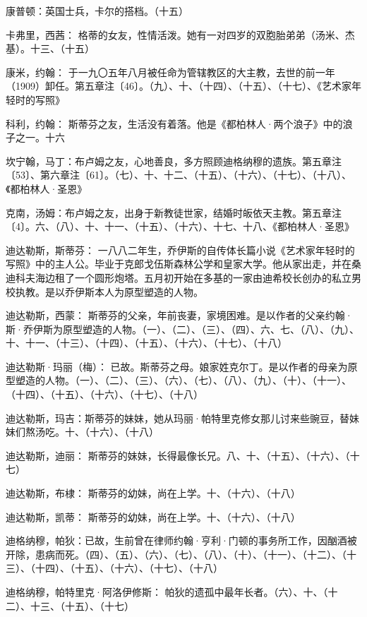 \par 康普顿：英国士兵，卡尔的搭档。（十五）
\par 卡弗里，西茜： 格蒂的女友，性情活泼。她有一对四岁的双胞胎弟弟（汤米、杰基）。十三、（十五）
\par 康米，约翰： 于一九〇五年八月被任命为管辖教区的大主教，去世的前一年（1909）卸任。第五章注〔46〕。（九）、十、（十四）、（十五）、（十七）、《艺术家年轻时的写照》
\par 科利，约翰： 斯蒂芬之友，生活没有着落。他是《都柏林人·两个浪子》中的浪子之一。十六
\par 坎宁翰，马丁：布卢姆之友，心地善良，多方照顾迪格纳穆的遗族。第五章注〔53〕、第六章注〔61〕。（七）、十、十二、（十五）、（十六）、（十七）、（十八）、《都柏林人·圣恩》
\par 克南，汤姆：布卢姆之友，出身于新教徒世家，结婚时皈依天主教。第五章注〔4〕。六、（八）、十、十一、（十五）、（十六）、十七、十八、《都柏林人·圣恩》
\par 迪达勒斯，斯蒂芬： 一八八二年生，乔伊斯的自传体长篇小说《艺术家年轻时的写照》中的主人公。毕业于克郎戈伍斯森林公学和皇家大学。他从家出走，并在桑迪科夫海边租了一个圆形炮塔。五月初开始在多基的一家由迪希校长创办的私立男校执教。是以乔伊斯本人为原型塑造的人物。
\par 迪达勒斯，西蒙： 斯蒂芬的父亲，年前丧妻，家境困难。是以作者的父亲约翰·斯·乔伊斯为原型塑造的人物。（一）、（二）、（三）、（四）、六、七、（八）、（九）、十、十一、（十三）、（十四）、（十五）、（十六）、（十七）、（十八）
\par 迪达勒斯·玛丽（梅）： 已故。斯蒂芬之母。娘家姓克尔丁。是以作者的母亲为原型塑造的人物。（一）、（二）、（三）、（六）、（七）、（八）、（九）、（十）、（十一）、（十四）、（十五）、（十六）、（十七）、（十八）
\par 迪达勒斯，玛吉：斯蒂芬的妹妹，她从玛丽·帕特里克修女那儿讨来些豌豆，替妹妹们熬汤吃。十、（十六）、（十八）
\par 迪达勒斯，迪丽： 斯蒂芬的妹妹，长得最像长兄。八、十、（十五）、（十六）、（十七）
\par 迪达勒斯，布棣： 斯蒂芬的幼妹，尚在上学。十、（十六）、（十八）
\par 迪达勒斯，凯蒂： 斯蒂芬的幼妹，尚在上学。十、（十六）、（十八）
\par 迪格纳穆，帕狄：已故，生前曾在律师约翰·亨利·门顿的事务所工作，因酗酒被开除，患病而死。（四）、（五）、（六）、（七）、（八）、（十）、（十一）、（十二）、（十三）、（十四）、（十五）、（十六）、（十七）、（十八）
\par 迪格纳穆，帕特里克·阿洛伊修斯： 帕狄的遗孤中最年长者。（六）、十、（十二）、十三、（十五）、（十七）
